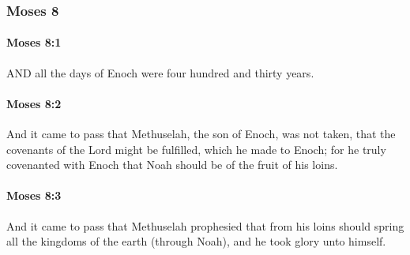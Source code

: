 	\subsubsection{Moses 8} %
		\label{MOSES-8}
		
		\paragraph{Moses 8:1} %
			\label{MOSES-8-1}

			AND all the days of Enoch were four hundred and thirty years.


		\paragraph{Moses 8:2} %
			\label{MOSES-8-2}

			And it came to pass that Methuselah, the son of Enoch, was not taken, that the covenants of the Lord might be fulfilled, which he made to Enoch; for he truly covenanted with Enoch that Noah should be of the fruit of his loins.


		\paragraph{Moses 8:3} %
			\label{MOSES-8-3}

			And it came to pass that Methuselah prophesied that from his loins should spring all the kingdoms of the earth (through Noah), and he took glory unto himself.

